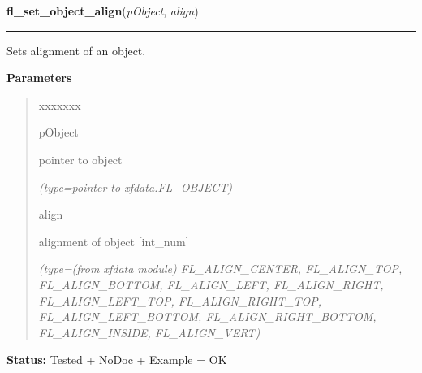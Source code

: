 \hspace{.8\funcindent}\begin{boxedminipage}{\funcwidth}

    \raggedright \textbf{fl\_set\_object\_align}(\textit{pObject}, \textit{align})

    \vspace{-1.5ex}

    \rule{\textwidth}{0.5\fboxrule}
\setlength{\parskip}{2ex}
    Sets alignment of an object.

\setlength{\parskip}{1ex}
      \textbf{Parameters}
      \vspace{-1ex}

      \begin{quote}
        \begin{Ventry}{xxxxxxx}

          \item[pObject]

          pointer to object

            {\it (type=pointer to xfdata.FL\_OBJECT)}

          \item[align]

          alignment of object [int\_num]

            {\it (type=(from xfdata module) FL\_ALIGN\_CENTER, FL\_ALIGN\_TOP, FL\_ALIGN\_BOTTOM, 
FL\_ALIGN\_LEFT, FL\_ALIGN\_RIGHT, FL\_ALIGN\_LEFT\_TOP, 
FL\_ALIGN\_RIGHT\_TOP, FL\_ALIGN\_LEFT\_BOTTOM, FL\_ALIGN\_RIGHT\_BOTTOM, 
FL\_ALIGN\_INSIDE, FL\_ALIGN\_VERT)}

        \end{Ventry}

      \end{quote}

\textbf{Status:} Tested + NoDoc + Example = OK



    \end{boxedminipage}

    \label{xformslib:library:fl_set_object_shortcut}

    \vspace{0.5ex}

